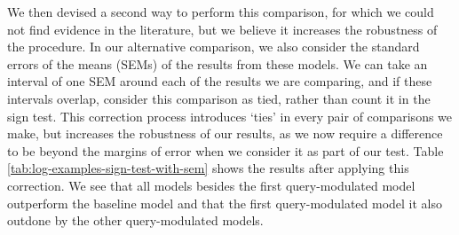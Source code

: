 We then devised a second way to perform this comparison, for which we could not find evidence in the literature, but we believe it increases the robustness of the procedure. In our alternative comparison, we also consider the standard errors of the means (SEMs) of the results from these models. We can take an interval of one SEM around each of the results we are comparing, and if these intervals overlap, consider this comparison as tied, rather than count it in the sign test. This correction process introduces ‘ties’ in every pair of comparisons we make, but increases the robustness of our results, as we now require a difference to be beyond the margins of error when we consider it as part of our test. Table \ref{tab:log-examples-sign-test-with-sem} shows the results after applying this correction. We see that all models besides the first query-modulated model outperform the baseline model and that the first query-modulated model it also outdone by the other query-modulated models.
